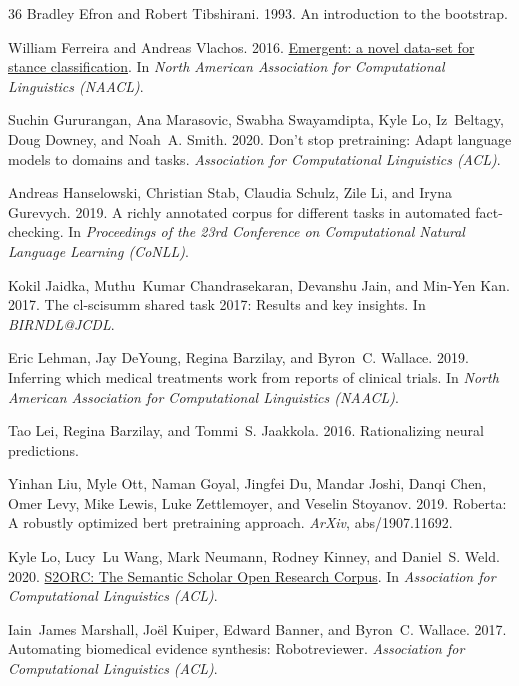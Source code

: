 \documentclass[11pt,a4paper]{article}
\begin{document}
\begin{thebibliography}{36}
Bradley Efron and Robert Tibshirani. 1993.
\newblock An introduction to the bootstrap.

William Ferreira and Andreas Vlachos. 2016.
\newblock \href {https://doi.org/10.18653/v1/N16-1138} {{E}mergent: a novel
  data-set for stance classification}.
\newblock In \emph{North American Association for Computational Linguistics
  (NAACL)}.

Suchin Gururangan, Ana Marasovic, Swabha Swayamdipta, Kyle Lo, Iz~Beltagy, Doug
  Downey, and Noah~A. Smith. 2020.
\newblock Don’t stop pretraining: Adapt language models to domains and tasks.
\newblock \emph{Association for Computational Linguistics (ACL)}.

Andreas Hanselowski, Christian Stab, Claudia Schulz, Zile Li, and Iryna
  Gurevych. 2019.
\newblock A richly annotated corpus for different tasks in automated
  fact-checking.
\newblock In \emph{Proceedings of the 23rd Conference on Computational Natural
  Language Learning (CoNLL)}.

Kokil Jaidka, Muthu~Kumar Chandrasekaran, Devanshu Jain, and Min-Yen Kan. 2017.
\newblock The cl-scisumm shared task 2017: Results and key insights.
\newblock In \emph{BIRNDL@JCDL}.

Eric Lehman, Jay DeYoung, Regina Barzilay, and Byron~C. Wallace. 2019.
\newblock Inferring which medical treatments work from reports of clinical
  trials.
\newblock In \emph{North American Association for Computational Linguistics
  (NAACL)}.

Tao Lei, Regina Barzilay, and Tommi~S. Jaakkola. 2016.
\newblock Rationalizing neural predictions.

Yinhan Liu, Myle Ott, Naman Goyal, Jingfei Du, Mandar Joshi, Danqi Chen, Omer
  Levy, Mike Lewis, Luke Zettlemoyer, and Veselin Stoyanov. 2019.
\newblock Roberta: A robustly optimized bert pretraining approach.
\newblock \emph{ArXiv}, abs/1907.11692.

Kyle Lo, Lucy~Lu Wang, Mark Neumann, Rodney Kinney, and Daniel~S. Weld. 2020.
\newblock \href {https://arxiv.org/abs/1911.02782} {{S2ORC: The Semantic
  Scholar Open Research Corpus}}.
\newblock In \emph{Association for Computational Linguistics (ACL)}.

Iain~James Marshall, Jo{\"e}l Kuiper, Edward Banner, and Byron~C. Wallace.
  2017.
\newblock Automating biomedical evidence synthesis: Robotreviewer.
\newblock \emph{Association for Computational Linguistics (ACL)}.


\end{thebibliography}
\end{document}
